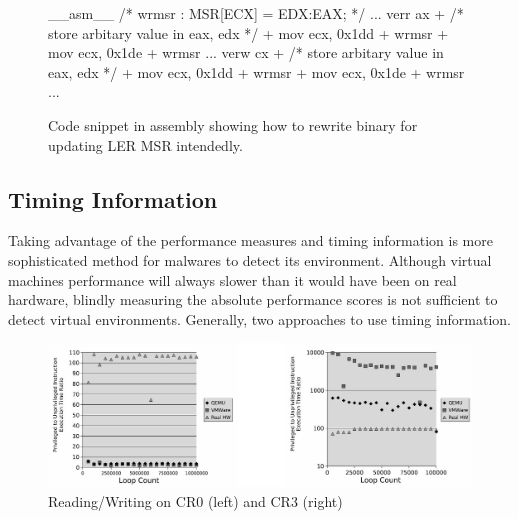 \begin{figure}[h]
\begin{lstc}
__asm__ {
	/* wrmsr : MSR[ECX] = EDX:EAX; */
	...
	verr ax
+	/* store arbitary value in eax, edx */
+	mov ecx, 0x1dd
+	wrmsr 
+	mov ecx, 0x1de
+	wrmsr
	...
	verw cx
+	/* store arbitary value in eax, edx */
+	mov ecx, 0x1dd
+	wrmsr
+	mov ecx, 0x1de
+	wrmsr
	...
}

\end{lstc}
\caption{\label{fig:wrmsr} Code snippet in assembly showing how to rewrite binary for updating LER MSR intendedly. }
\end{figure}

\subsection{Timing Information}
\label{sec:approach-timing}
Taking advantage of the performance measures and timing information is more sophisticated method for malwares to detect its environment. Although virtual machine\textquotesingle s performance will always slower than it would have been on real hardware, blindly measuring the absolute performance scores is not sufficient to detect virtual environments.\cite{raffetseder2007} Generally, two approaches to use timing information.

\begin{figure}[!t]
	\centering
	\includegraphics[width=\textwidth]{figure/comp_inst.jpg}
	\caption{Reading/Writing on CR0 (left) and CR3 (right)}
	\label{fig:comparison_of_instructions}
\end{figure}

